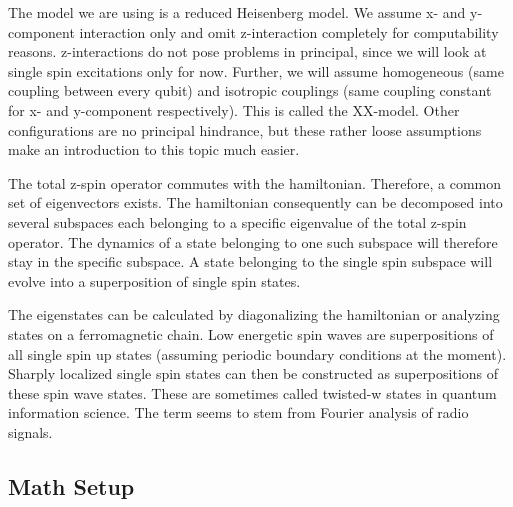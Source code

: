 \noindent The model we are using is a reduced Heisenberg model. We assume x- and y-component interaction only and omit z-interaction completely for computability reasons. z-interactions do not pose problems in principal, since we will look at single spin excitations only for now. Further, we will assume homogeneous (same coupling between every qubit) and isotropic couplings (same coupling constant for x- and y-component respectively). This is called the XX-model. Other configurations are no principal hindrance, but these rather loose assumptions make an introduction to this topic much easier.\par
The total z-spin operator commutes with the hamiltonian. Therefore, a common set of eigenvectors exists. The hamiltonian consequently can be decomposed into several subspaces each belonging to a specific eigenvalue of the total z-spin operator. The dynamics of a state belonging to one such subspace will therefore stay in the specific subspace. A state belonging to the single spin subspace will evolve into a superposition of single spin states.\par
The eigenstates can be calculated by diagonalizing the hamiltonian or analyzing states on a ferromagnetic chain. Low energetic spin waves are superpositions of all single spin up states (assuming periodic boundary conditions at the moment). Sharply localized single spin states can then be constructed as superpositions of these spin wave states. These are sometimes called twisted-w states in quantum information science. The term seems to stem from Fourier analysis of radio signals.

\subsection{Math Setup}

